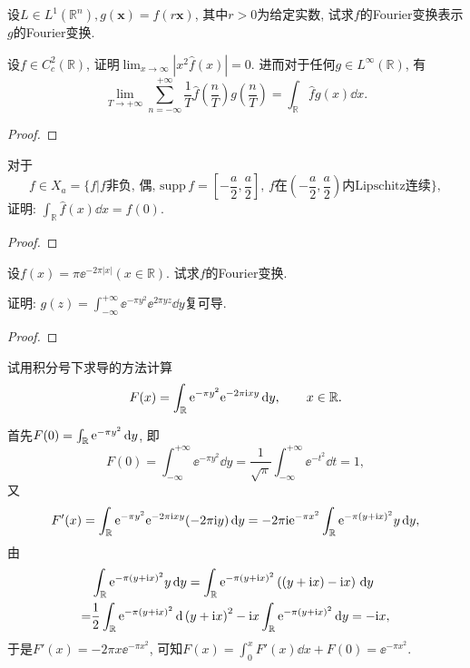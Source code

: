 \begin{quiza}
\woe 设\(L\in L^1(\mathbb{R}^n),g(\boldsymbol{x})=f(r\boldsymbol{x})\), 其中\(r>0\)为给定实数, 试求\(f\)的Fourier变换表示\(g\)的Fourier变换.
\begin{solution}
	
\end{solution}
\woe 设\(f\in C_c^2(\mathbb{R})\), 证明\(\lim_{x\rightarrow\infty}\left|x^2\widehat{f}(x)\right|=0\). 进而对于任何\(g\in L^{\infty}(\mathbb{R})\), 有\[\lim_{T\rightarrow +\infty}\sum_{n=-\infty}^{+\infty}\frac{1}{T}\widehat{f}\left(\frac{n}{T}\right)g\left(\frac{n}{T}\right)=\int_{\mathbb{R}}\widehat{f}g(x)\dd x.\]
\begin{proof}
	
\end{proof}
\woe 对于\[f\in X_a=\{f\big|f\text{非负, 偶, }\mathrm{supp}\,f=\left[-\frac{a}{2},\frac{a}{2}\right],\,f\text{在}\left(-\frac{a}{2},\frac{a}{2}\right)\text{内Lipschitz连续}\},\]证明: \(\int_{\mathbb{R}}\widehat{f}(x)\dd x=f(0).\)
\begin{proof}
	
\end{proof}
\woe 设\(f(x)=\pi\ee^{-2\pi |x|}(x\in\mathbb{R})\). 试求\(f\)的Fourier变换.
\begin{solution}
	
\end{solution}
\woe 证明: \(g(z)=\int_{-\infty}^{+\infty}\ee^{-\pi y^2}\ee^{2\pi yz}\dd y\)复可导.
\begin{proof}
	
\end{proof}
\woe 试用积分号下求导的方法计算\[F(x)=\int_{\mathbb{R}}\mathrm{e}^{-\pi y^2}\mathrm{e}^{-2\pi\mathrm{i}xy}\,\mathrm{d} y,\qquad x\in\mathbb{R}.\]
\begin{solution}
	首先\(F(0)=\int_{\mathbb{R}}\mathrm{e}^{-\pi y^2}\,\mathrm{d} y\), 即\[F(0)=\int_{-\infty}^{+\infty}\ee^{-\pi y^2}\dd y=\frac{1}{\sqrt{\pi}}\int_{-\infty}^{+\infty}\ee^{-t^2}\dd t=1,\]又\[F'(x)=\int_{\mathbb{R}}\mathrm{e}^{-\pi y^2}\mathrm{e}^{-2\pi\mathrm{i} xy}(-2\pi\mathrm{i} y)\,\mathrm{d} y=-2\pi\mathrm{i}\mathrm{e}^{-\pi x^2}\int_{\mathbb{R}}\mathrm{e}^{-\pi(y+\mathrm{i} x)^2}y\,\mathrm{d} y,\]由\[\begin{split}
	&\int_{\mathbb{R}}\mathrm{e}^{-\pi(y+\mathrm{i} x)^2}y\,\mathrm{d} y=\int_{\mathbb{R}}\mathrm{e}^{-\pi(y+\mathrm{i} x)^2}\left(\left(y+\mathrm{i} x\right)-\mathrm{i} x\right)\,\mathrm{d} y\\=&\frac{1}{2}\int_{\mathbb{R}}\mathrm{e}^{-\pi(y+\mathrm{i} x)^2}\,\mathrm{d}\left(y+\mathrm{i} x\right)^2-\mathrm{i} x\int_{\mathbb{R}}\mathrm{e}^{-\pi(y+\mathrm{i} x)^2}\,\mathrm{d} y=-\mathrm{i} x,
	\end{split}\]于是\(F'(x)=-2\pi x\ee^{-\pi x^2}\), 可知\(F(x)=\int_{0}^{x}F'(x)\dd x+F(0)=\ee^{-\pi x^2}\).
\end{solution}
\end{quiza}
